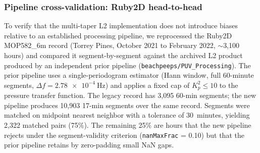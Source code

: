 
\subsubsection{Pipeline cross-validation: Ruby2D head-to-head}
\label{sec:ruby2d-validation}


To verify that the multi-taper L2 implementation does not introduce
biases relative to an established processing pipeline, we reprocessed
the Ruby2D MOP582\_6m record (Torrey Pines, October 2021 to February 2022,
$\sim$3,100 hours) and compared it segment-by-segment against the
archived L2 product produced by an independent prior pipeline
(\texttt{beachpeeps/PUV\_Processing}). The prior
pipeline uses a single-periodogram estimator (Hann window, full
60-minute segments, $\Delta f = \SI{2.78e-4}{\hertz}$) and applies a
fixed cap of $K_p^2 \le 10$ to the pressure transfer function. The legacy
record has 3,095 60-min segments; the new pipeline produces 10,903 17-min
segments over the same record. Segments were matched on midpoint
nearest neighbor with a tolerance of 30~minutes, yielding 2,322 matched
pairs (75\%). The remaining 25\% are hours that the new pipeline rejects
under the segment-validity criterion (\texttt{nanMaxFrac} = 0.10) but
that the prior pipeline retains by zero-padding small NaN gaps.

